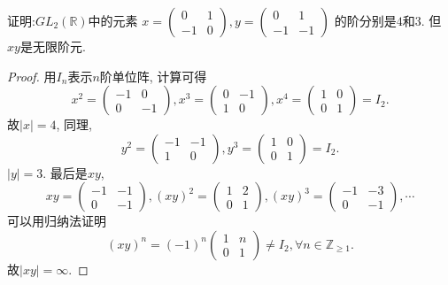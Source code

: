 \documentclass{../solutions-cn}
\begin{document}
\begin{exercise}[习题1.3.11]
    证明:$GL_2(\mathbb{R})$中的元素
    \(
        x = \begin{pmatrix}
            0 & 1\\
            -1 & 0
        \end{pmatrix},
        y = \begin{pmatrix}
            0 & 1\\
            -1 & -1
        \end{pmatrix}
    \)
    的阶分别是$4$和$3$. 但$xy$是无限阶元.
\end{exercise}

\begin{proof}
    用$I_n$表示$n$阶单位阵, 计算可得
    \[
        x^2 = \begin{pmatrix}
            -1 & 0 \\
            0 & -1
        \end{pmatrix},
        x^3 = \begin{pmatrix}
            0 & -1 \\
            1 & 0
        \end{pmatrix},
        x^4 = \begin{pmatrix}
            1 & 0 \\
            0 & 1
        \end{pmatrix} = I_2.
    \]
    故$|x| = 4$, 同理,
    \[
        y^2 = \begin{pmatrix}
            -1 & -1 \\
            1 & 0
        \end{pmatrix},
        y^3 = \begin{pmatrix}
            1 & 0 \\
            0 & 1
        \end{pmatrix} = I_2.
    \]
    $|y| = 3$. 最后是$xy$,
    \[
        xy = \begin{pmatrix}
            -1 & -1 \\
            0 & -1
        \end{pmatrix},
        (xy)^2 = \begin{pmatrix}
            1 & 2 \\
            0 & 1
        \end{pmatrix},
        (xy)^3 = \begin{pmatrix}
            -1 & -3 \\
            0 & -1
        \end{pmatrix}, \cdots
    \]
    可以用归纳法证明
    \[
        (xy)^n = (-1)^n
        \begin{pmatrix}
            1 & n \\
            0 & 1
        \end{pmatrix}
        \neq I_2, \forall n \in \mathbb{Z}_{\geqslant 1}.
    \]
    故$|xy| = \infty$.
\end{proof}
\end{document}
